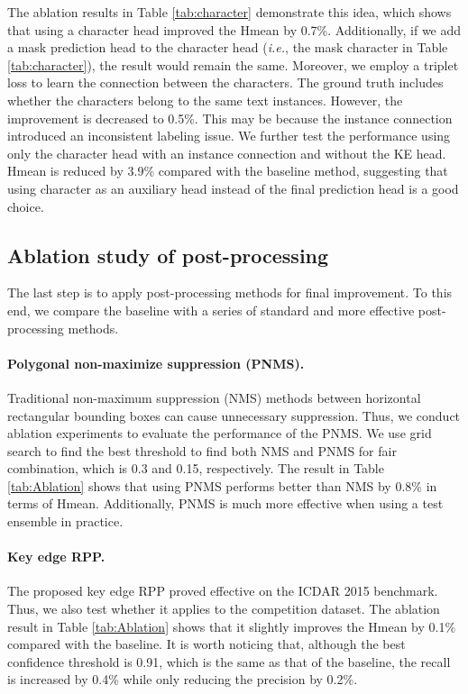 The ablation results in Table \ref{tab:character} demonstrate this idea, which shows that using a character head improved the Hmean by 0.7\%. Additionally, if we add a mask prediction head to the character head (\textit{i.e.}, the mask character in Table \ref{tab:character}), the result would remain the same. Moreover, we employ a triplet loss to learn the connection between the characters. The ground truth includes whether the characters belong to the same text instances. However, the improvement is decreased to 0.5\%. This may be because the instance connection introduced an inconsistent labeling issue. We further test the performance using only the character head with an instance connection and without the KE head. Hmean is reduced by 3.9\% compared with the baseline method, suggesting that using character as an auxiliary head instead of the final prediction head is a good choice.


\subsection{Ablation study of post-processing}
\label{subsec:ab_post}
The last step is to apply post-processing methods for final improvement. To this end, we compare the baseline with a series of standard and more effective post-processing methods.

\paragraph{Polygonal non-maximize suppression (PNMS).} Traditional non-maximum suppression (NMS) methods between horizontal rectangular bounding boxes can cause unnecessary suppression. Thus, we conduct ablation experiments to evaluate the performance of the PNMS. We use  grid search to find the best threshold to find both NMS and PNMS for fair combination, which is 0.3 and 0.15, respectively. The result in Table \ref{tab:Ablation} shows that using PNMS performs better than NMS by 0.8\% in terms of Hmean. Additionally, PNMS is
much more effective when using a test ensemble in practice. 


\paragraph{Key edge RPP.} The proposed key edge RPP proved effective on the ICDAR 2015 benchmark. Thus, we also test whether it applies 
to the competition dataset. The ablation result in Table \ref{tab:Ablation} shows that it slightly improves  the Hmean by 0.1\% compared with the baseline. It is worth noticing that, although the best confidence threshold  is 0.91, which is the same as that of the baseline, the recall is increased by 0.4\% while only reducing the precision by 0.2\%.


